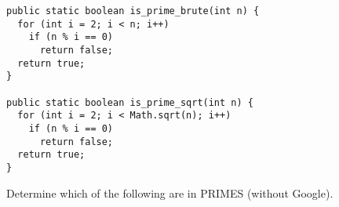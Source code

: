 \documentclass[a4paper, 12pt]{exam}
\begin{document}
\begin{questions}
  \begin{solution}
    \begin{verbatim}
public static boolean is_prime_brute(int n) {
  for (int i = 2; i < n; i++)
    if (n % i == 0)
      return false;
  return true;
}

public static boolean is_prime_sqrt(int n) {
  for (int i = 2; i < Math.sqrt(n); i++)
    if (n % i == 0)
      return false;
  return true;
}
    \end{verbatim}
  \end{solution}


\question
  Determine which of the following are in PRIMES (without Google).
  \begin{solution}
\end{solution}
\end{questions}
\end{document}
